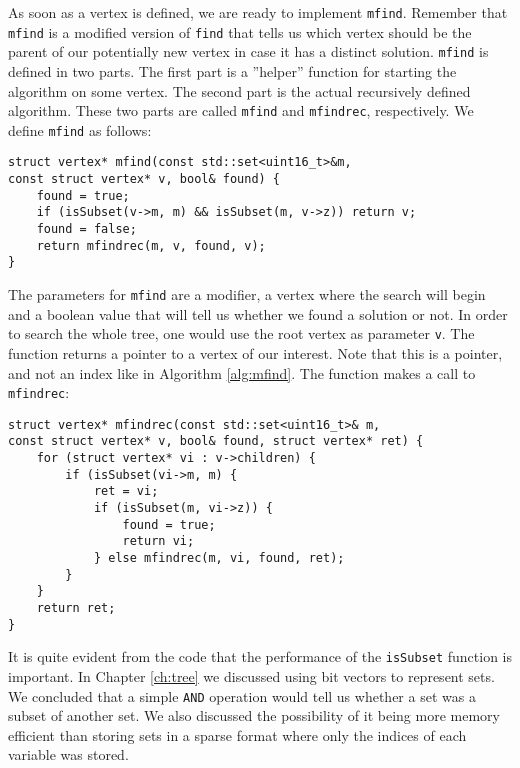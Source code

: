 As soon as a vertex is defined, we are ready to implement \texttt{mfind}.
Remember that \texttt{mfind} is a modified version of \texttt{find} that tells
us which vertex should be the parent of our potentially new vertex in case it
has a distinct solution.
\texttt{mfind} is defined in two parts. The first part is a ''helper'' function
for starting the algorithm on some vertex. The second part is the actual
recursively defined algorithm. These two parts are called \texttt{mfind} and
\texttt{mfindrec}, respectively. We define \texttt{mfind} as follows:
\newpage
\begin{verbatim}
struct vertex* mfind(const std::set<uint16_t>&m,
const struct vertex* v, bool& found) {
    found = true;
    if (isSubset(v->m, m) && isSubset(m, v->z)) return v;
    found = false;
    return mfindrec(m, v, found, v);
}
\end{verbatim}
The parameters for \texttt{mfind} are a modifier, a vertex where the search
will begin and a boolean value that will tell us whether we found a
solution or not.
In order to search the whole tree, one would use the root vertex as parameter
\texttt{v}. The function returns a pointer to a vertex of our interest.
Note that this is a pointer, and not an index like in Algorithm
\ref{alg:mfind}. The function makes a call to \texttt{mfindrec}:
\begin{verbatim}
struct vertex* mfindrec(const std::set<uint16_t>& m,
const struct vertex* v, bool& found, struct vertex* ret) {
    for (struct vertex* vi : v->children) {
        if (isSubset(vi->m, m) {
            ret = vi;
            if (isSubset(m, vi->z)) {
                found = true;
                return vi;
            } else mfindrec(m, vi, found, ret);
        }
    }
    return ret;
}
\end{verbatim}
It is quite evident from the code that the performance of the \texttt{isSubset}
function is important. In Chapter \ref{ch:tree} we discussed using bit vectors 
to represent sets. We concluded that a simple \texttt{AND} operation would tell
us whether a set was a subset of another set.
We also discussed the possibility of it being more memory efficient than
storing sets in a sparse format where only the indices of each variable was
stored.

